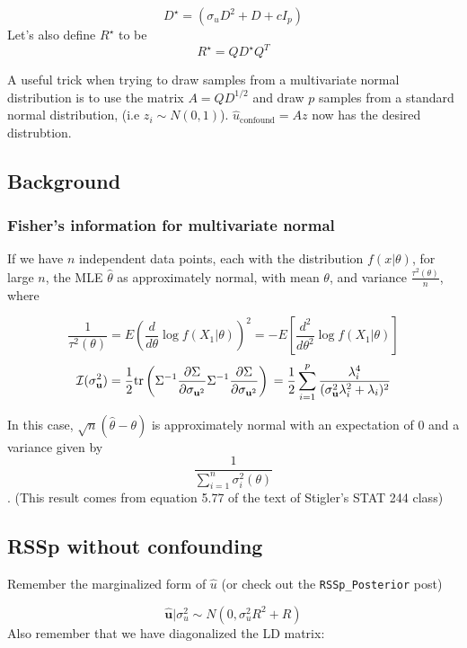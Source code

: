 $$D^{\star}=(\sigma_uD^2+D+c I_p)$$
Let's also define \(R^\star\) to be 
$$R^\star=Q D^{\star}Q^{T}$$

A useful trick when trying to draw samples from a multivariate normal distribution
is to use the matrix \(A=QD^{1/2}\) and  draw \(p\) samples from a standard normal distribution, (i.e \(z_i \sim N(0,1)\)).  \(\hat{u}_{\text{confound}}=Az\) now has the desired distrubtion.




\subsection{Background}\label{sec:org13cff0e}

\subsubsection{Fisher's information for multivariate normal}\label{sec:orgc6a5fb9}

If we have \(n\) independent data points, each with the distribution \(f(x|\theta)\), for large \(n\), the MLE \(\hat{\theta}\) as approximately normal, with mean \(\theta\), and variance \(\frac{\tau^2(\theta)}{n}\), where 

$$ \frac{1}{\tau^2(\theta)}=E \left( \frac{d}{d \theta} \log f(X_1|\theta) \right)^2 = -E \left[ \frac{d^2}{d\theta^2} \log f(X_1|\theta) \right]$$
$$\mathcal{I}(\sigma_\textbf{u}^2)=\frac{1}{2}\text{tr}\left( \Sigma^{-1} \frac{\partial  \Sigma}{\partial \sigma_{\textbf{u}^2}}  \Sigma^{-1} \frac{\partial  \Sigma}{\partial \sigma_{\textbf{u}^2}} \right) \\ 
=\frac{1}{2}\sum_{i=1}^p \frac{\lambda_i^4}{(\sigma_\textbf{u}^2 \lambda_i^2+\lambda_i)^2} $$

In this case, \(\sqrt{n}(\hat{\theta}-\theta)\) is approximately normal with an expectation of \(0\)  and a variance given by $$\frac{1}{\sum_{i=1}^n \sigma_i^2(\theta)}$$.  (This result comes from equation 5.77 of the text of Stigler's STAT 244 class)



\subsection{RSSp without confounding}\label{sec:org68d2164}

Remember the marginalized form of \(\hat{u}\) (or check out the \texttt{RSSp\_Posterior} post)

$$ \hat{\textbf{u}}|\sigma_u^2 \sim N(0,\sigma_u^2R^2+R)$$
Also remember that we have diagonalized the LD matrix:

